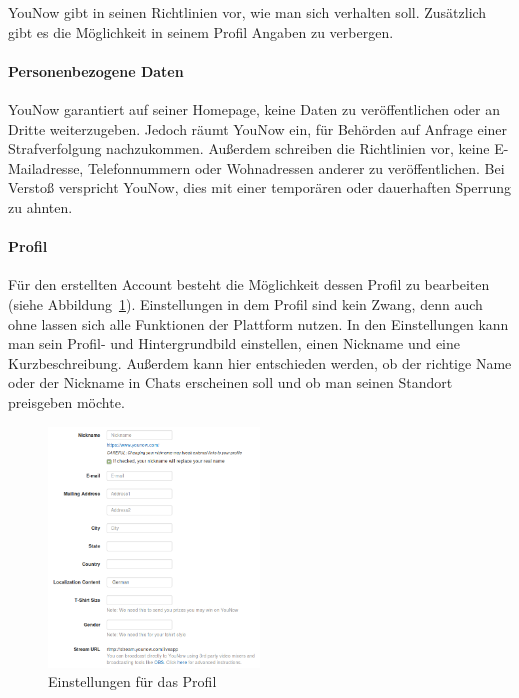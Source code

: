 YouNow gibt in seinen Richtlinien vor, wie man sich verhalten soll. Zusätzlich gibt es die Möglichkeit in seinem Profil Angaben zu verbergen.

\paragraph{Personenbezogene Daten}
YouNow garantiert auf seiner Homepage, keine Daten zu veröffentlichen oder an Dritte weiterzugeben. Jedoch räumt YouNow ein, für Behörden auf Anfrage einer Strafverfolgung nachzukommen. Außerdem schreiben die Richtlinien vor, keine E-Mailadresse, Telefonnummern oder Wohnadressen anderer zu veröffentlichen. Bei Verstoß verspricht YouNow, dies mit einer temporären oder dauerhaften Sperrung zu ahnten.  

\paragraph{Profil}
Für den erstellten Account besteht die Möglichkeit dessen Profil zu bearbeiten (siehe Abbildung~\ref{profil_einstellungen}). Einstellungen in dem Profil sind kein Zwang, denn auch ohne lassen sich alle Funktionen der Plattform nutzen. In den Einstellungen kann man sein Profil- und Hintergrundbild einstellen, einen Nickname und eine Kurzbeschreibung. Außerdem kann hier entschieden werden, ob der richtige Name oder der Nickname in Chats erscheinen soll und ob man seinen Standort preisgeben möchte.

\begin{figure}[h!]
\centering
\includegraphics[width=0.5\textwidth]{./resources/younow_profile_settings}
\caption{Einstellungen für das Profil}
\label{profil_einstellungen}
\end{figure} 

